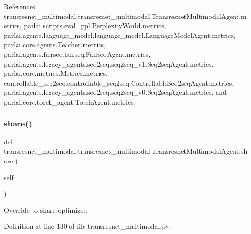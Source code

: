 References transresnet\+\_\+multimodal.\+transresnet\+\_\+multimodal.\+Transresnet\+Multimodal\+Agent.\+metrics, parlai.\+scripts.\+eval\+\_\+ppl.\+Perplexity\+World.\+metrics, parlai.\+agents.\+language\+\_\+model.\+language\+\_\+model.\+Language\+Model\+Agent.\+metrics, parlai.\+core.\+agents.\+Teacher.\+metrics, parlai.\+agents.\+fairseq.\+fairseq.\+Fairseq\+Agent.\+metrics, parlai.\+agents.\+legacy\+\_\+agents.\+seq2seq.\+seq2seq\+\_\+v1.\+Seq2seq\+Agent.\+metrics, parlai.\+core.\+metrics.\+Metrics.\+metrics, controllable\+\_\+seq2seq.\+controllable\+\_\+seq2seq.\+Controllable\+Seq2seq\+Agent.\+metrics, parlai.\+agents.\+legacy\+\_\+agents.\+seq2seq.\+seq2seq\+\_\+v0.\+Seq2seq\+Agent.\+metrics, and parlai.\+core.\+torch\+\_\+agent.\+Torch\+Agent.\+metrics.

\mbox{\label{classtransresnet__multimodal_1_1transresnet__multimodal_1_1TransresnetMultimodalAgent_a94742281daa7e237302c849e529d8592}} 
\subsubsection{\texorpdfstring{share()}{share()}}
{\footnotesize\ttfamily def transresnet\+\_\+multimodal.\+transresnet\+\_\+multimodal.\+Transresnet\+Multimodal\+Agent.\+share (\begin{DoxyParamCaption}\item[{}]{self }\end{DoxyParamCaption})}

\begin{DoxyVerb}Override to share optimizer.\end{DoxyVerb}
 

Definition at line 130 of file transresnet\+\_\+multimodal.\+py.



